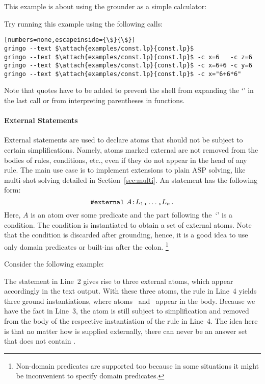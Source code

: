 \begin{example}
This example is about using the grounder as a simple calculator:
%

%
Try running this example using the following calls:
%
\begin{lstlisting}[numbers=none,escapeinside={\$}{\$}]
gringo --text $\attach{examples/const.lp}{const.lp}$
gringo --text $\attach{examples/const.lp}{const.lp}$ -c x=6   -c z=6
gringo --text $\attach{examples/const.lp}{const.lp}$ -c x=6+6 -c y=6
gringo --text $\attach{examples/const.lp}{const.lp}$ -c x="6+6*6"
\end{lstlisting}
%
Note that quotes have to be added to prevent the shell from expanding the `\code{*}' in the last call
or from interpreting parentheses in functions.
\end{example}

\paragraph{External Statements}
%
External statements are used to declare atoms
that should not be subject to certain simplifications.
Namely,
atoms marked external are not removed from the bodies of rules, conditions, etc.,
even if they do not appear in the head of any rule.
The main use case is to implement extensions to plain ASP solving,
like multi-shot solving detailed in Section~\ref{sec:multi}.
An  statement has the following form:
%
\[\texttt{\#external}~A\texttt{:}L_1\texttt{,}\dots\texttt{,}L_n\texttt{.}\]
%
Here, $A$ is an atom over some predicate and
the part following the~`\code{:}' is a condition.
The condition is instantiated to obtain a set of external atoms.
Note that the condition is discarded after grounding,
hence, it is a good idea to use only domain predicates or built-ins after the colon.%
\footnote{Non-domain predicates are supported too
because in some situations it might be inconvenient to specify domain predicates.}

\begin{example}
Consider the following example:%
%

%
The  statement in Line~2 gives rise to three external atoms,
which appear accordingly in the text output.
With these three atoms,
the rule in Line~4 yields three ground instantiations,
where atoms~ and~ appear in the body.
Because we have the fact  in Line~3,
the atom  is still subject to simplification
and removed from the body of the respective instantiation of the rule in Line~4.
The idea here is that no matter how  is supplied externally,
there can never be an answer set that does not contain .
\end{example}

